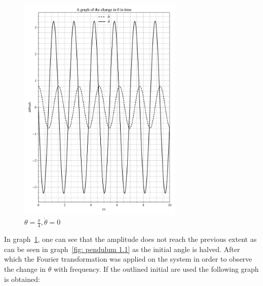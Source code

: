 \documentclass[12pt, a4paper]{article}
\begin{document}
\begin{figure}[H]
    \centering
    \includegraphics[width = 0.7\textwidth]{plots/Plot 1.5.png}\caption{\(\theta = \frac{\pi}{4}, \dot{\theta} = 0\)}\label{fig: pendulum 1.2}
\end{figure}

In graph~\ref{fig: pendulum 1.2}, one can see that the amplitude does not reach the previous extent as can be seen in graph~\ref{fig: pendulum 1.1} as the initial angle is halved. After which the Fourier transformation was applied on the system in order to observe the change in \(\theta\) with frequency. If the outlined initial are used the following graph is obtained:
\end{document}
